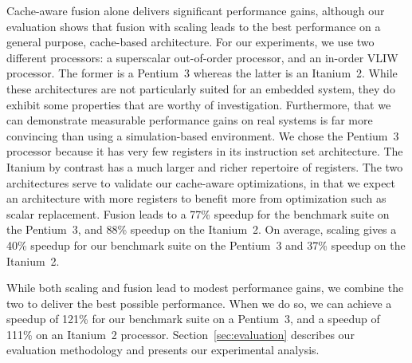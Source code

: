 Cache-aware fusion alone delivers significant performance gains, although our
evaluation shows that fusion with scaling leads to the best
performance on a general purpose, cache-based architecture. For our
experiments, we use two different processors: a superscalar out-of-order
processor, and an in-order VLIW processor. The former is a Pentium~3
whereas the latter is an Itanium~2. While these architectures are not
particularly suited for an embedded system, they do exhibit some
properties that are worthy of investigation. Furthermore, that we can
demonstrate measurable performance gains on real systems is far more
convincing than using a simulation-based environment. We chose the
Pentium~3 processor because it has very few registers in its
instruction set architecture. The Itanium by contrast has a much 
larger and richer repertoire of registers. The two architectures serve
to validate our cache-aware optimizations, in that we expect an
architecture with more registers to benefit more from optimization such
as scalar replacement. Fusion leads to a 77\% speedup for
the benchmark suite on the Pentium~3, and 88\% speedup on the Itanium~2.  
On average, scaling gives a 40\% speedup for our benchmark suite
on the Pentium~3 and 37\% speedup on the Itanium~2.

While both scaling and fusion lead to modest performance gains, we
combine the two to deliver the best possible performance. When we
do so, we can achieve a speedup of 121\% for our benchmark suite on a 
Pentium~3, and a speedup of 111\% on an Itanium~2 processor.
Section~\ref{sec:evaluation} describes our evaluation
methodology and presents our experimental analysis.


